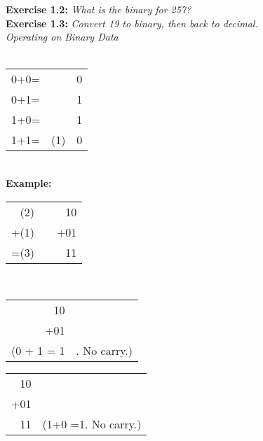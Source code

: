 \documentclass[12pt]{book}
\begin{document}
\noindent\textbf{Exercise 1.2:} \textit{What is the binary for 257?}\\

\noindent\textbf{Exercise 1.3:} \textit{Convert 19 to binary, then back to decimal.}\\

\noindent\textit{Operating on Binary Data}\\

\\
\begin{table}[H]
\begin{center}
\begin{tabular}{rll}
0+0= & & 0 \\
0+1= & & 1 \\
1+0= & & 1 \\
1+1= & (1) & 0
\end{tabular}\end{center}\end{table}
\\
\textbf{Example:}\\
\begin{table}[H]\begin{center}\begin{tabular}{rlr}
(2)  &  & 10  \\
+(1) &  & +01 \\ \cline{1-1} \cline{3-3} 
=(3) &  & 11 
\end{tabular}\end{center}\end{table}
\\

\begin{table}[H]\begin{center}\begin{tabular}{rr}
10 & \\
+01 & \\\cline{1-1}
(0 + 1 = 1 & . No carry.)
\end{tabular}\end{center}\end{table}
\begin{table}[H]\begin{center}\begin{tabular}{rr}
10 & \\
+01 & \\\cline{1-1}
11 & (1+0 =1. No carry.)
\end{tabular}\end{center}\end{table}
\end{document}
